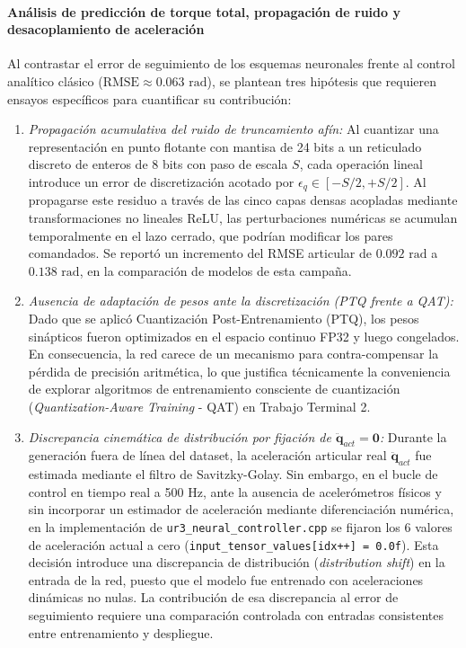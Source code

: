 \documentclass[12pt]{article}
\begin{document}
\paragraph{Análisis de predicción de torque total, propagación de ruido y desacoplamiento de aceleración}
Al contrastar el error de seguimiento de los esquemas neuronales frente al control analítico clásico ($\text{RMSE} \approx 0.063\text{ rad}$), se plantean tres hipótesis que requieren ensayos específicos para cuantificar su contribución:
\begin{enumerate}
    \item \textit{Propagación acumulativa del ruido de truncamiento afín:} Al cuantizar una representación en punto flotante con mantisa de 24 bits a un reticulado discreto de enteros de 8 bits con paso de escala $S$, cada operación lineal introduce un error de discretización acotado por $\epsilon_q \in [-S/2, +S/2]$. Al propagarse este residuo a través de las cinco capas densas acopladas mediante transformaciones no lineales ReLU, las perturbaciones numéricas se acumulan temporalmente en el lazo cerrado, que podrían modificar los pares comandados. Se reportó un incremento del RMSE articular de $0.092\text{ rad}$ a $0.138\text{ rad}$, en la comparación de modelos de esta campaña.
    \item \textit{Ausencia de adaptación de pesos ante la discretización (PTQ frente a QAT):} Dado que se aplicó Cuantización Post-Entrenamiento (PTQ), los pesos sinápticos fueron optimizados en el espacio continuo FP32 y luego congelados. En consecuencia, la red carece de un mecanismo para contra-compensar la pérdida de precisión aritmética, lo que justifica técnicamente la conveniencia de explorar algoritmos de entrenamiento consciente de cuantización (\textit{Quantization-Aware Training} - QAT) en Trabajo Terminal 2.
    \item \textit{Discrepancia cinemática de distribución por fijación de $\ddot{\bm{q}}_{act} = \bm{0}$:} Durante la generación fuera de línea del dataset, la aceleración articular real $\ddot{\bm{q}}_{act}$ fue estimada mediante el filtro de Savitzky-Golay. Sin embargo, en el bucle de control en tiempo real a 500 Hz, ante la ausencia de acelerómetros físicos y sin incorporar un estimador de aceleración mediante diferenciación numérica, en la implementación de \texttt{ur3\_neural\_controller.cpp} se fijaron los 6 valores de aceleración actual a cero (\lstinline|input_tensor_values[idx++] = 0.0f|). Esta decisión introduce una discrepancia de distribución (\textit{distribution shift}) en la entrada de la red, puesto que el modelo fue entrenado con aceleraciones dinámicas no nulas. La contribución de esa discrepancia al error de seguimiento requiere una comparación controlada con entradas consistentes entre entrenamiento y despliegue.
\end{enumerate}
\end{document}

